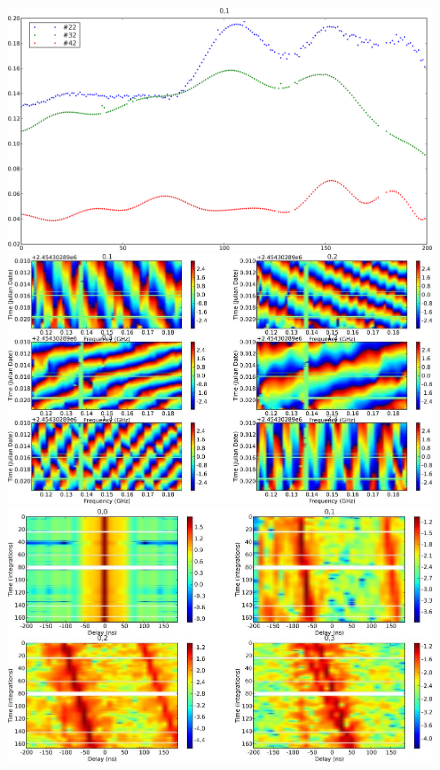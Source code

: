 \begin{figure}
\begin{center}
\includegraphics[scale=.23]{plot_uv1.png}
\includegraphics[scale=.23]{plot_uv2.jpg}\\
\includegraphics[scale=.23]{plot_uv3.jpg}

\end{center}
\end{figure}
